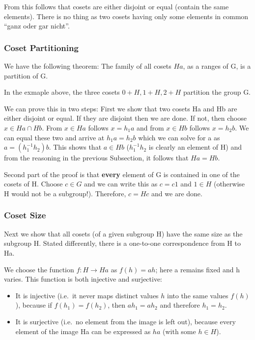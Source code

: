 From this follows that cosets are either disjoint or equal (contain the
same elements). There is no thing as two cosets having only some
elements in common ``ganz oder gar nicht''.

\subsubsection{Coset Partitioning}\label{coset-partitioning}

We have the following theorem: The family of all cosets \(Ha\), as a
ranges of G, is a partition of G.

In the exmaple above, the three cosets \(0 + H, 1 + H, 2 + H\) partition
the group G.

We can prove this in two steps: First we show that two cosets Ha and Hb
are either disjoint or equal. If they are disjoint then we are done. If
not, then choose \(x \in Ha \cap Hb\). From \(x \in Ha\) follows
\(x = h_1 a\) and from \(x \in Hb\) follows \(x = h_2 b\). We can equal
these two and arrive at \(h_1 a = h_2 b\) which we can solve for a as
\(a = (h_1^{-1} h_2) b\). This shows that \(a \in Hb\) (\(h_1^{-1} h_2\)
is clearly an element of H) and from the reasoning in the previous
Subsection, it follows that \(Ha = Hb\).

Second part of the proof is that \textbf{every} element of G is
contained in one of the cosets of H. Choose \(c \in G\) and we can write
this as \(c = c1\) and \(1 \in H\) (otherwise H would not be a
subgroup!). Therefore, \(c = Hc\) and we are done.

\subsubsection{Coset Size}\label{coset-size}

Next we show that all cosets (of a given subgroup H) have the same size
as the subgroup H. Stated differently, there is a one-to-one
correspondence from H to Ha.

We choose the function \(f:H \rightarrow Ha\) as \(f(h) = ah\); here a
remains fixed and h varies. This function is both injective and
surjective:

\begin{itemize}
\item
  It is injective (i.e.~it never maps distinct values \(h\) into the
  same values \(f(h)\)), because if \(f(h_1) = f(h_2)\), then
  \(ah_1 = ah_2\) and therefore \(h_1 = h_2\).
\item
  It is surjective (i.e.~no element from the image is left out), because
  every element of the image Ha can be expressed as \(ha\) (with some
  \(h \in H\)).
\end{itemize}

